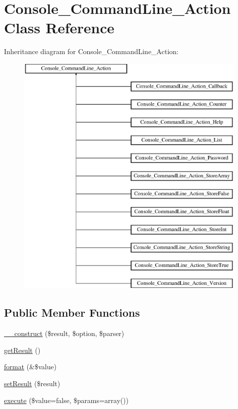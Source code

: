 \hypertarget{class_console___command_line___action}{
\section{Console\_\-CommandLine\_\-Action Class Reference}
\label{class_console___command_line___action}
}
Inheritance diagram for Console\_\-CommandLine\_\-Action:\begin{figure}[H]
\begin{center}
\leavevmode
\includegraphics[height=12.000000cm]{class_console___command_line___action}
\end{center}
\end{figure}
\subsection*{Public Member Functions}
\begin{DoxyCompactItemize}
\item 
\hyperlink{class_console___command_line___action_a3d946951a64ed8c2846fe8fb1c7edec0}{\_\-\_\-construct} (\$result, \$option, \$parser)
\item 
\hyperlink{class_console___command_line___action_ae077eb8a032a325ceb939bfabfa5f472}{getResult} ()
\item 
\hyperlink{class_console___command_line___action_adcda5408e56dac72b67a1e92d37431c3}{format} (\&\$value)
\item 
\hyperlink{class_console___command_line___action_a02644cacaff67ad8a6b92bbe6127321f}{setResult} (\$result)
\item 
\hyperlink{class_console___command_line___action_a37f62eb63fef4cc7c2d5f438190b307a}{execute} (\$value=false, \$params=array())
\end{DoxyCompactItemize}
